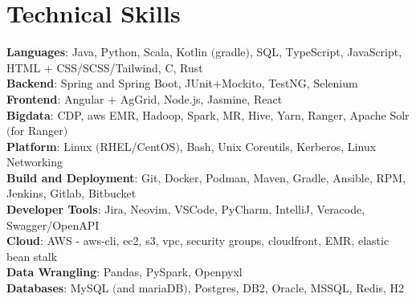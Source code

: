 \documentclass[letterpaper,11pt]{article}
\begin{document}
\section{Technical Skills}
 \begin{itemize}[leftmargin=0.15in, label={}]
    \small{\item{
     \textbf{Languages}{: Java, Python, Scala, Kotlin $($gradle$)$, SQL, TypeScript, JavaScript, HTML + CSS/SCSS/Tailwind, C, Rust} \\
     \textbf{Backend}{: Spring and Spring Boot, JUnit+Mockito, TestNG, Selenium } \\
     \textbf{Frontend}{: Angular + AgGrid, Node.js, Jasmine, React} \\
     \textbf{Bigdata}{: CDP, aws EMR, Hadoop, Spark, MR, Hive, Yarn, Ranger, Apache Solr $($for Ranger$)$} \\
     \textbf{Platform}{: Linux $($RHEL/CentOS$)$, Bash, Unix Coreutils, Kerberos, Linux Networking } \\
     \textbf{Build and Deployment}{: Git, Docker, Podman, Maven, Gradle, Ansible, RPM, Jenkins, Gitlab, Bitbucket} \\
     \textbf{Developer Tools}{: Jira, Neovim, VSCode, PyCharm, IntelliJ, Veracode, Swagger/OpenAPI} \\
     \textbf{Cloud}{: AWS - aws-cli, ec2, s3, vpc, security groups, cloudfront, EMR, elastic bean stalk} \\
     \textbf{Data Wrangling}{: Pandas, PySpark,  Openpyxl}\\
     \textbf{Databases}{: MySQL $($and mariaDB$)$, Postgres, DB2, Oracle, MSSQL, Redis, H2}
    }}
 \end{itemize}


\end{document}
